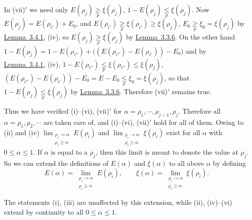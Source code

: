 \documentclass[twoside,leqno]{article}
\newcommand{\StatementRef}[2]{\hyperlink{stmt:#1}{#2}}
\begin{document}
In (vii)$'$ we need only
\(E(\rho_j)\mathrel{\underset p{\geq}}\xi(\rho_j)\),
\(1-E(\rho_j)\mathrel{\underset p{\leq}}\xi(\rho_j)\).
Now $E(\rho_j)=E(\rho_{i'})+E_0$, and
\(E(\rho_{i'})\mathrel{\underset p{\geq}}\xi(\rho_{i'})
\geq\xi(\rho_j)\),
\(E_0\mathrel{\underset p{\geq}}\xi_0=\xi(\rho_j)\)
by \StatementRef{lemma:3.4.1}{Lemma~3.4.1}, (iv), so
$E(\rho_j)\mathrel{\underset p{\geq}}\xi(\rho_j)$ by
\StatementRef{lemma:3.3.6}{Lemma~3.3.6}.
On the other hand
\(1-E(\rho_j)=1-E(\rho_{i''})
+\bigl((E(\rho_{i''})-E(\rho_{i'}))-E_0\bigr)\)
and by \StatementRef{lemma:3.4.1}{Lemma~3.4.1}, (iv),
\(1-E(\rho_{i''})\mathrel{\underset p{\leq}}\xi(\rho_{i''})
\leq\xi(\rho_j)\),
\((E(\rho_{i''})-E(\rho_{i'}))-E_0
=E-E_0\mathrel{\underset p{\leq}}\xi_0=\xi(\rho_j)\),
so that $1-E(\rho_j)\mathrel{\underset p{\leq}}\xi(\rho_j)$ by
\StatementRef{lemma:3.3.6}{Lemma~3.3.6}. Therefore (vii)$'$ remains true.

Thus we have verified (i)--(vi), (vii)$'$ for
$\alpha=\rho_1,\cdots,\rho_{j-1},\rho_j$. Therefore all
$\alpha=\rho_1,\rho_2,\cdots$ are taken care of, and (i)--(vi), (vii)$'$
hold for all of them. Owing to (ii) and (iv)
\(\lim_{\substack{\rho_i\to\alpha\\\rho_i\geq\alpha}}E(\rho_i)\) and
\(\lim_{\substack{\rho_i\to\alpha\\\rho_i\geq\alpha}}\xi(\rho_i)\)
exist for all $\alpha$ with $0\leq\alpha\leq1$. If $\alpha$ is equal to a
$\rho_j$, then this limit is meant to denote the value at $\rho_j$. So we
can extend the definitions of $E(\alpha)$ and $\xi(\alpha)$ to all above
$\alpha$ by defining
\[
 E(\alpha)=\lim_{\substack{\rho_i\to\alpha\\\rho_i\geq\alpha}}E(\rho_i),
 \qquad
 \xi(\alpha)=\lim_{\substack{\rho_i\to\alpha\\\rho_i\geq\alpha}}\xi(\rho_i).
\]

The statements (i), (iii) are unaffected by this extension, while (ii),
(iv)--(vi) extend by continuity to all $0\leq\alpha\leq1$.
\end{document}
